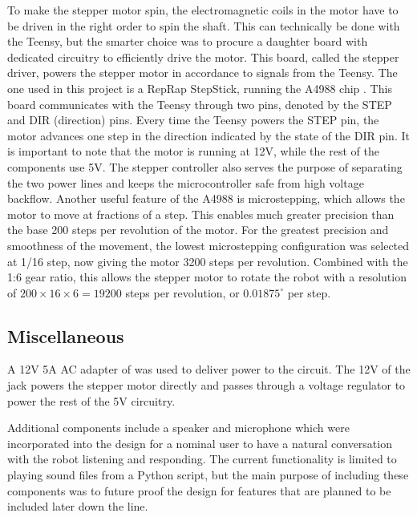 To make the stepper motor spin, the electromagnetic coils in the motor have to be driven in the right order to spin the shaft. This can technically be done with the Teensy, but the smarter choice was to procure a daughter board with dedicated circuitry to efficiently drive the motor. This board, called the stepper driver, powers the stepper motor in accordance to signals from the Teensy. The one used in this project is a RepRap StepStick, running the A4988 chip \cite{bowyerStepStickRepRap2020}. This board communicates with the Teensy through two pins, denoted by the STEP and DIR (direction) pins. Every time the Teensy powers the STEP pin, the motor advances one step in the direction indicated by the state of the DIR pin. It is important to note that the motor is running at 12V, while the rest of the components use 5V. The stepper controller also serves the purpose of separating the two power lines and keeps the microcontroller safe from high voltage backflow. Another useful feature of the A4988 is microstepping, which allows the motor to move at fractions of a step. This enables much greater precision than the base 200 steps per revolution of the motor. For the greatest precision and smoothness of the movement, the lowest microstepping configuration was selected at 1/16 step, now giving the motor 3200 steps per revolution. Combined with the 1:6 gear ratio, this allows the stepper motor to rotate the robot with a resolution of $200\times16\times6=19200$ steps per revolution, or $0.01875^\circ$ per step.

\subsection{Miscellaneous}
A 12V 5A AC adapter of was used to deliver power to the circuit. The 12V of the jack powers the stepper motor directly and passes through a voltage regulator to power the rest of the 5V circuitry.

Additional components include a speaker and microphone which were incorporated into the design for a nominal user to have a natural conversation with the robot listening and responding. The current functionality is limited to playing sound files from a Python script, but the main purpose of including these components was to future proof the design for features that are planned to be included later down the line.

